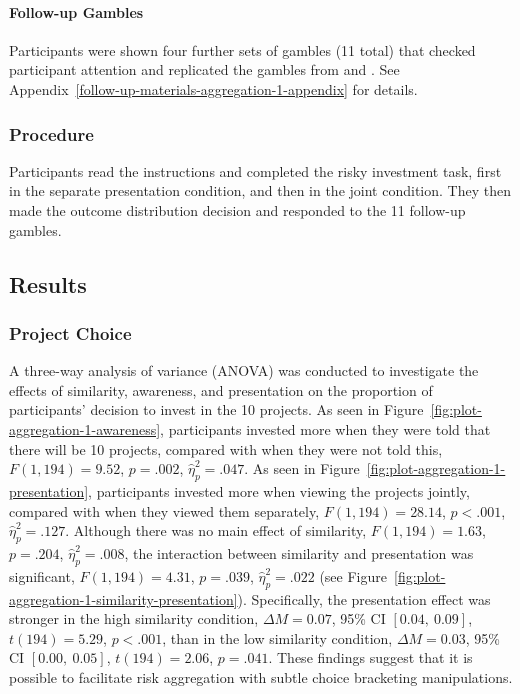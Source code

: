\documentclass[a4paper, nobind]{templates/ociamthesis}
\theoremstyle{definition}
\theoremstyle{definition}
\theoremstyle{definition}
\theoremstyle{definition}
\theoremstyle{remark}
\begin{document}
\paragraph{Follow-up Gambles}

Participants were shown four further sets of gambles (11 total) that checked
participant attention and replicated the gambles from \textcite{samuelson1963} and
\textcite{redelmeier1992}. See Appendix~\ref{follow-up-materials-aggregation-1-appendix}
for details.

\subsubsection{Procedure}

Participants read the instructions and completed the risky investment task,
first in the separate presentation condition, and then in the joint condition.
They then made the outcome distribution decision and responded to the 11
follow-up gambles.

\hypertarget{results-aggregation-1}{%
\subsection{Results}\label{results-aggregation-1}}

\subsubsection{Project Choice}

A three-way analysis of variance (ANOVA) was conducted to investigate the
effects of similarity, awareness, and presentation on the proportion of
participants' decision to invest in the 10 projects. As seen in
Figure~\ref{fig:plot-aggregation-1-awareness}, participants invested more when
they were told that there will be 10 projects, compared with when they were not
told this, \(F(1, 194) = 9.52\), \(p = .002\), \(\hat{\eta}^2_p = .047\). As seen in
Figure~\ref{fig:plot-aggregation-1-presentation}, participants invested more
when viewing the projects jointly, compared with when they viewed them separately,
\(F(1, 194) = 28.14\), \(p < .001\), \(\hat{\eta}^2_p = .127\). Although there was no main effect of
similarity, \(F(1, 194) = 1.63\), \(p = .204\), \(\hat{\eta}^2_p = .008\), the interaction between
similarity and presentation was significant,
\(F(1, 194) = 4.31\), \(p = .039\), \(\hat{\eta}^2_p = .022\) (see
Figure~\ref{fig:plot-aggregation-1-similarity-presentation}). Specifically, the
presentation effect was stronger in the high similarity condition,
\(\Delta M = 0.07\), 95\% CI \([0.04,~0.09]\), \(t(194) = 5.29\), \(p < .001\), than in the low similarity
condition, \(\Delta M = 0.03\), 95\% CI \([0.00,~0.05]\), \(t(194) = 2.06\), \(p = .041\). These findings
suggest that it is possible to facilitate risk aggregation with subtle choice
bracketing manipulations.
\end{document}
